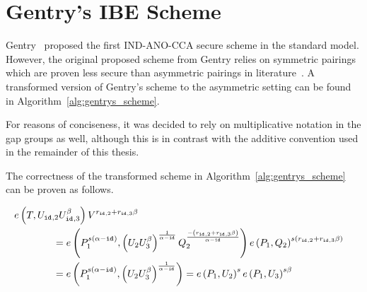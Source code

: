 \chapter{Gentry's IBE Scheme}
\label{app:gentrys_ibe_scheme}
Gentry~\cite{art:Gentry06} proposed the first IND-ANO-CCA secure scheme in the standard model. However, the original proposed scheme from Gentry relies on symmetric pairings which are proven less secure than asymmetric pairings in literature~\cite{art:AdjMOR13,art:BarbulescuGJT14,art:Joux13}. A transformed version of Gentry's scheme to the asymmetric setting can be found in Algorithm~\ref{alg:gentrys_scheme}.

For reasons of conciseness, it was decided to rely on multiplicative notation in the gap groups as well, although this is in contrast with the additive convention used in the remainder of this thesis.

The correctness of the transformed scheme in Algorithm~\ref{alg:gentrys_scheme} can be proven as follows.

\begin{equation*}
 \begin{split}
  e \left( T, U_{\id{},2} U_{\id{},3}^{\beta} \right) V^{ r_{\id{},2} + r_{\id{},3} \beta} \\
  & \negthickspace \negthickspace \negthickspace \negthickspace \negthickspace \negthickspace \negthickspace \negthickspace \negthickspace \negthickspace \negthickspace \negthickspace \negthickspace \negthickspace \negthickspace \negthickspace\negthickspace \negthickspace \negthickspace \negthickspace \negthickspace \negthickspace \negthickspace \negthickspace \negthickspace \negthickspace \negthickspace \negthickspace \negthickspace \negthickspace \negthickspace = e \left( P_1^{s\left( \alpha - \id{} \right)}, \left( U_{2}U_{3}^{\beta} \right)^{\frac{1}{\alpha - \id{}}} Q_2^{\frac{- \left( r_{\id{},2} + r_{\id{},3} \beta \right)}{\alpha - \id{}}} \right) e \left( P_1, Q_2 \right)^{s \left( r_{\id{},2} + r_{\id{},3} \beta \right)} \\
 & \negthickspace \negthickspace \negthickspace \negthickspace \negthickspace \negthickspace \negthickspace \negthickspace \negthickspace \negthickspace \negthickspace \negthickspace \negthickspace \negthickspace \negthickspace \negthickspace \negthickspace \negthickspace \negthickspace \negthickspace \negthickspace \negthickspace \negthickspace \negthickspace \negthickspace \negthickspace \negthickspace \negthickspace \negthickspace \negthickspace \negthickspace = e \left( P_1^{s\left( \alpha - \id{} \right)}, \left( U_{2}U_{3}^{\beta} \right)^{\frac{1}{\alpha - \id{}}} \right) = e \left( P_1, U_2 \right)^s e \left( P_1, U_3\right)^{s \beta}
 \end{split}
\end{equation*}


